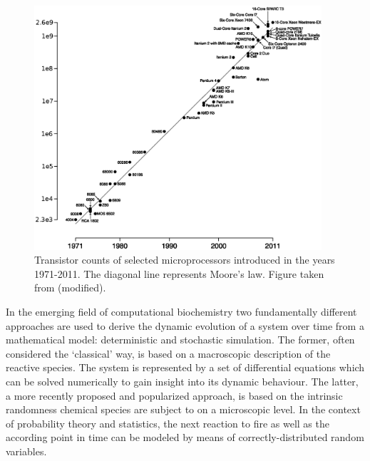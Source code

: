 {\begin{figure}
\centering
\includegraphics[trim = 20mm 10mm 0mm 0mm, clip,width=0.95\textwidth]{images/TransistorCount.eps}
\caption{Transistor counts of selected microprocessors introduced in the years 1971-2011. The diagonal line represents Moore's law. Figure taken from \cite{wgsimon_transistor_2011} (modified).}
\label{fig:moore_data}
\end{figure}

In the emerging field of computational biochemistry two fundamentally different approaches are used to derive the dynamic evolution of a system over time from a mathematical model: deterministic and stochastic simulation. The former, often considered the `classical' way, is based on a macroscopic description of the reactive species. The system is represented by a set of differential equations which can be solved numerically to gain insight into its dynamic behaviour. The latter, a more recently proposed and popularized approach, is based on the intrinsic randomness chemical species are subject to on a microscopic level. In the context of probability theory and statistics, the next reaction to fire as well as the according point in time can be modeled by means of correctly-distributed random variables. 

}
